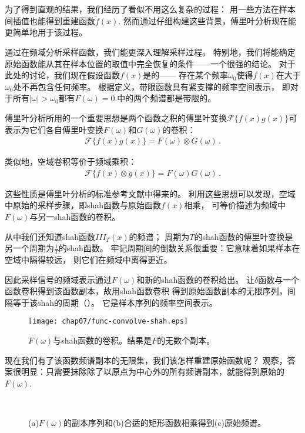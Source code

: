 为了得到直观的结果，我们经历了看似不用这么复杂的过程：
用一些方法在样本间插值也能得到重建函数$\tilde{f}(x)$.
然而通过仔细构建这些背景，傅里叶分析现在能更简单地用于该过程。

通过在频域分析采样函数，我们能更深入理解采样过程。
特别地，我们将能确定原始函数能从其在样本位置的取值中完全恢复的条件——一个很强的结论。
对于此处的讨论，我们现在假设函数$f(x)$是的——
存在某个频率$\omega_0$使得$f(x)$在大于$\omega_0$处不再包含任何频率。
根据定义，带限函数具有紧支撑的频率空间表示，
即对于所有$|\omega|>\omega_0$都有$F(\omega)=0$.中的两个频谱都是带限的。

傅里叶分析所用的一个重要思想是两个函数之积的傅里叶变换$\mathcal{F}\{f(x)g(x)\}$可
表示为它们各自傅里叶变换$F(\omega)$和$G(\omega)$的卷积：
\begin{align*}
    \mathcal{F}\{f(x)g(x)\}=F(\omega)\otimes G(\omega)\, .
\end{align*}

类似地，空域卷积等价于频域乘积：
\begin{align}\label{eq:7.3}
    \mathcal{F}\{f(x)\otimes g(x)\}=F(\omega)G(\omega)\, .
\end{align}

这些性质是傅里叶分析的标准参考文献中得来的。
利用这些思想可以发现，空域中原始的采样步骤，即shah函数与原始函数$f(x)$相乘，
可等价描述为频域中$F(\omega)$与另一shah函数的卷积。

从中我们还知道shah函数$III_T(x)$的频谱；
周期为$T$的shah函数的傅里叶变换是另一个周期为$\displaystyle\frac{1}{T}$的shah函数。
牢记周期间的倒数关系很重要：它意味着如果样本在空域中隔得较远，
则它们在频域中离得更近。

因此采样信号的频域表示通过$F(\omega)$和新的shah函数的卷积给出。
让$\delta$函数与一个函数卷积得到该函数副本，故用shah函数卷积
得到原始函数副本的无限序列，间隔等于该shah的周期（）。
它是样本序列的频率空间表示。
\begin{figure}[htbp]
    \centering\texttt{[image: chap07/func-convolve-shah.eps]}
    \caption{$F(\omega)$与shah函数的卷积。结果是$F$的无数个副本。}
    \label{fig:7.6}
\end{figure}

现在我们有了该函数频谱副本的无限集，我们该怎样重建原始函数呢？
观察，答案很明显：只需要抹除除了以原点为中心外的所有频谱副本，就能得到原始的$F(\omega)$.
\begin{figure}[htbp]
    \centering
    \,
    \,
    \caption{(a)$F(\omega)$的副本序列和(b)合适的矩形函数相乘得到(c)原始频谱。}
    \label{fig:7.7}
\end{figure}

